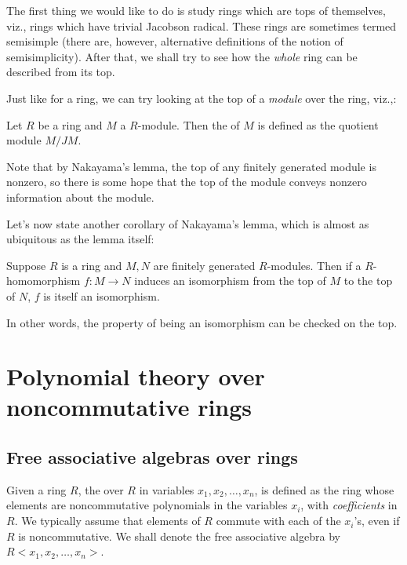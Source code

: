 \documentclass[a4paper]{amsart}
\begin{document}
The first thing we would like to do is study rings which are tops of
themselves, viz., rings which have trivial Jacobson radical. These rings
are sometimes termed semisimple (there are, however, alternative
definitions of the notion of semisimplicity). After that, we shall try
to see how the {\em whole} ring can be described from its top.

Just like for a ring, we can try looking at the top of a {\em module}
over the ring, viz.,:

\begin{definer}
  Let $R$ be a ring and $M$ a $R$-module. Then the  of
  $M$ is defined as the quotient module $M/JM$.
\end{definer}

Note that by Nakayama's lemma, the top of any finitely generated
module is nonzero, so there is some hope that the top of the module
conveys nonzero information about the module.

Let's now state another corollary of Nakayama's lemma, which is almost
as ubiquitous as the lemma itself:

\begin{theorem}
  Suppose $R$ is a ring and $M,N$ are finitely generated $R$-modules.
  Then if a $R$-homomorphism $f:M \to N$ induces an isomorphism from
  the top of $M$ to the top of $N$, $f$ is itself an isomorphism.
\end{theorem}

In other words, the property of being an isomorphism can be checked on
the top.

\section{Polynomial theory over noncommutative rings}

\subsection{Free associative algebras over rings}

Given a ring $R$, the  over $R$
in variables $x_1, x_2, \ldots, x_n$, is defined as the ring whose
elements are noncommutative polynomials in the variables $x_i$, with
{\em coefficients} in $R$. We typically assume that elements of $R$
commute with each of the $x_i$'s, even if $R$ is noncommutative. We shall
denote the free associative algebra by $R<x_1,x_2,\ldots,x_n>$.
\end{document}
